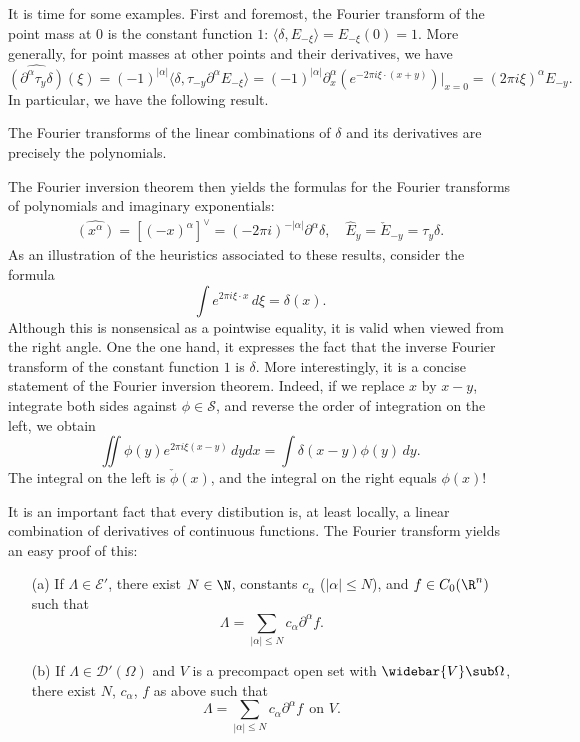 It is time for some examples. First and foremost, the Fourier transform of the point mass at $0$ is the constant function $1$: $\langle\delta,E_{-\xi}\rangle=E_{-\xi}(0)=1$. More generally, for point masses at other points and their derivatives, we have
\[\widehat{(\partial^\alpha\tau_y\delta)}(\xi)=(-1)^{|\alpha|}\langle\delta,\tau_{-y}\partial^\alpha E_{-\xi}\rangle=(-1)^{|\alpha|}\partial^\alpha_x(e^{-2\pi i\xi\cdot(x+y)})|_{x=0}=(2\pi i\xi)^\alpha E_{-y}.\]
In particular, we have the following result.
\begin{proposition}\label{Fourier transform of polynomial is delta}
The Fourier transforms of the linear combinations of $\delta$ and its derivatives are precisely the polynomials.
\end{proposition}
The Fourier inversion theorem then yields the formulas for the Fourier transforms of polynomials and imaginary exponentials:
\begin{align}\label{Fourier transform of polynomial and exponentia}
\widehat{(x^\alpha)}=[(-x)^\alpha]^{\vee}=(-2\pi i)^{-|\alpha|}\partial^\alpha\delta,\quad \hat{E}_{y}=\check{E}_{-y}=\tau_y\delta.
\end{align}
As an illustration of the heuristics associated to these results, consider the formula
\[\int e^{2\pi i\xi\cdot x}\,d\xi=\delta(x).\]
Although this is nonsensical as a pointwise equality, it is valid when viewed from the right angle. One the one hand, it expresses the fact that the inverse Fourier transform of the constant function $1$ is $\delta$. More interestingly, it is a concise statement of the Fourier inversion theorem. Indeed, if we replace $x$ by $x-y$, integrate both sides against $\phi\in\mathscr{S}$, and reverse the order of integration on the left, we obtain
\[\iint\phi(y)e^{2\pi i\xi(x-y)}\,dydx=\int\delta(x-y)\phi(y)\,dy.\]
The integral on the left is $\check{\phi}(x)$, and the integral on the right equals $\phi(x)$!\par
It is an important fact that every distibution is, at least locally, a linear combination of derivatives of continuous functions. The Fourier transform yields an easy proof of this:
\begin{proposition}
\mbox{}
\begin{itemize}
\item[(a)] If $\Lambda\in\mathscr{E}'$, there exist $N\in\N$, constants $c_\alpha$ ($|\alpha|\leq N$), and $f\in C_0(\R^n)$ such that \[\Lambda=\sum_{|\alpha|\leq N}c_\alpha\partial^\alpha f.\]
\item[(b)] If $\Lambda\in\mathscr{D}'(\Omega)$ and $V$ is a precompact open set with $\widebar{V}\sub\Omega$, there exist $N$, $c_\alpha$, $f$ as above such that
\[\Lambda=\sum_{|\alpha|\leq N}c_\alpha\partial^\alpha f\ \ \text{on }V.\] 
\end{itemize}
\end{proposition}
